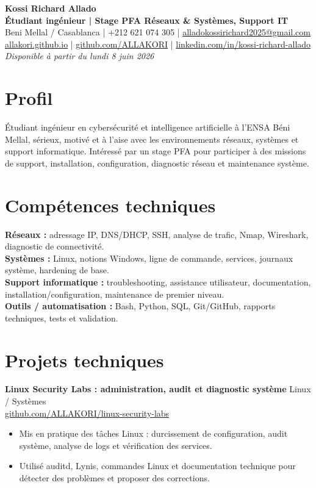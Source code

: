 \documentclass[10pt,a4paper]{article}
\begin{document}
\begin{center}
{\LARGE \textbf{Kossi Richard Allado}}\\[2pt]
{\large \textbf{Étudiant ingénieur | Stage PFA Réseaux \& Systèmes, Support IT}}\\[4pt]
Beni Mellal / Casablanca \quad | \quad +212 621 074 305 \quad | \quad \href{mailto:alladokossirichard2025@gmail.com}{alladokossirichard2025@gmail.com}\\[2pt]
\href{https://allakori.github.io/}{allakori.github.io} \quad | \quad \href{https://github.com/ALLAKORI}{github.com/ALLAKORI} \quad | \quad \href{https://www.linkedin.com/in/kossi-richard-allado-50177b2a5}{linkedin.com/in/kossi-richard-allado}\\[3pt]
\textit{Disponible à partir du lundi 8 juin 2026}
\end{center}
\vspace{-3pt}

\section{Profil}
Étudiant ingénieur en cybersécurité et intelligence artificielle à l'ENSA Béni Mellal, sérieux, motivé et à l'aise avec les environnements réseaux, systèmes et support informatique. Intéressé par un stage PFA pour participer à des missions de support, installation, configuration, diagnostic réseau et maintenance système.

\section{Compétences techniques}
\textbf{Réseaux :} adressage IP, DNS/DHCP, SSH, analyse de trafic, Nmap, Wireshark, diagnostic de connectivité.\\
\textbf{Systèmes :} Linux, notions Windows, ligne de commande, services, journaux système, hardening de base.\\
\textbf{Support informatique :} troubleshooting, assistance utilisateur, documentation, installation/configuration, maintenance de premier niveau.\\
\textbf{Outils / automatisation :} Bash, Python, SQL, Git/GitHub, rapports techniques, tests et validation.

\section{Projets techniques}
\textbf{Linux Security Labs : administration, audit et diagnostic système} \hfill Linux / Systèmes\\
\href{https://github.com/ALLAKORI/linux-security-labs}{github.com/ALLAKORI/linux-security-labs}
\begin{itemize}
  \item Mis en pratique des tâches Linux : durcissement de configuration, audit système, analyse de logs et vérification des services.
  \item Utilisé auditd, Lynis, commandes Linux et documentation technique pour détecter des problèmes et proposer des corrections.
\end{itemize}
\end{document}
